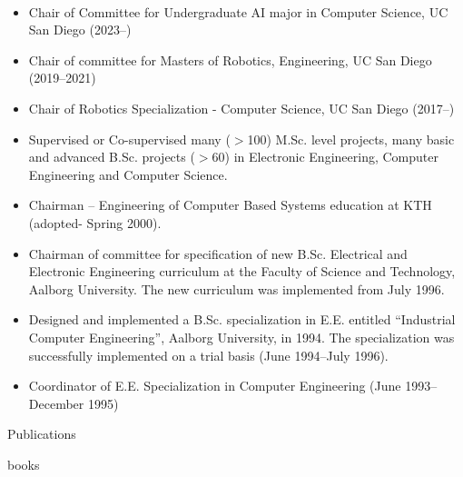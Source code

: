 \documentclass{article}
\begin{document}
\begin{cv}
\begin{cvlist}{~}
\item[Other Teaching Activities]
\begin{itemize}
  \item Chair of Committee for Undergraduate AI major in Computer Science, UC San Diego (2023--)
  \item Chair of committee for Masters of Robotics, Engineering, 
    UC San Diego (2019--2021)

  \item Chair of Robotics Specialization - Computer Science, UC San
    Diego (2017--)

  \item Supervised or Co-supervised many ($>$100) M.Sc. level projects,
    many basic and advanced B.Sc. projects ($>$60) in Electronic
    Engineering, Computer Engineering and Computer Science.

  \item Chairman -- Engineering of Computer Based Systems education at
    KTH (adopted- Spring 2000).

  \item Chairman of committee for specification of new B.Sc. Electrical
    and Electronic Engineering curriculum at the Faculty of Science and
    Technology, Aalborg University.  The new curriculum was implemented
    from July 1996.

  \item Designed and implemented a B.Sc. specialization in E.E.
    entitled ``Industrial Computer Engineering'', Aalborg University, in
    1994.  The specialization was successfully implemented on a trial
    basis (June 1994--July 1996).

  \item Coordinator of E.E. Specialization in Computer Engineering (June
    1993--December 1995)
\end{itemize}
\end{cvlist}



\begin{cvlist}{Publications}
\item[Books]
  \begin{btSect}{books}
    \btPrintAll
  \end{btSect}


\end{cvlist}
\end{cv}
\end{document}
